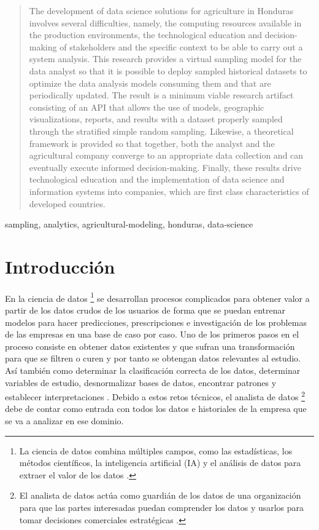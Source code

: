 \documentclass[conference]{IEEEtran}
\begin{document}
\begin{abstract}
The development of data science solutions for agriculture in Honduras involves several difficulties, namely, the computing resources available in the production environments, the technological education and decision-making of stakeholders and the specific context to be able to carry out a system analysis. This research provides a virtual sampling model for the data analyst so that it is possible to deploy sampled historical datasets to optimize the data analysis models consuming them and that are periodically updated. The result is a minimum viable research artifact consisting of an API that allows the use of models, geographic visualizations, reports, and results with a dataset properly sampled through the stratified simple random sampling. Likewise, a theoretical framework is provided so that together, both the analyst and the agricultural company converge to an appropriate data collection and can eventually execute informed decision-making. Finally, these results drive technological education and the implementation of data science and information systems into companies, which are first class characteristics of developed countries.
\end{abstract}

\bigbreak

\begin{IEEEkeywords}
sampling, analytics, agricultural-modeling, honduras, data-science
\end{IEEEkeywords}



\section{Introducción}

En la ciencia de datos \footnote{La ciencia de datos combina múltiples campos, como las estadísticas, los métodos científicos, la inteligencia artificial (IA) y el análisis de datos para extraer el valor de los datos \cite{oracle-data-science-2021}.} se desarrollan procesos complicados para obtener valor a partir de los datos crudos de los usuarios de forma que se puedan entrenar modelos para hacer predicciones, prescripciones e investigación de los problemas de las empresas en una base de caso por caso. Uno de los primeros pasos en el proceso consiste en obtener datos existentes y que sufran una transformación para que se filtren o curen y por tanto se obtengan datos relevantes al estudio. Así también como determinar la clasificación correcta de los datos, determinar variables de estudio, desnormalizar bases de datos, encontrar patrones y establecer  interpretaciones \cite{university-of-wisconsin-data-science-2021}. Debido a estos retos técnicos, el analista de datos \footnote{El analista de datos actúa como guardián de los datos de una organización para que las partes interesadas puedan comprender los datos y usarlos para tomar decisiones comerciales estratégicas \cite{eastwood-data-analyst-2021}.} debe de contar como entrada con todos los datos e historiales de la empresa que se va a analizar en ese dominio.
\end{document}

